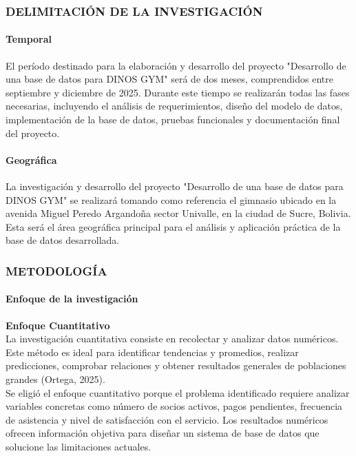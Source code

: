\documentclass[12pt, letterpaper]{article}
\begin{document}
\subsubsection{DELIMITACIÓN DE LA INVESTIGACIÓN}
\paragraph{Temporal}
El período destinado para la elaboración y desarrollo del proyecto "Desarrollo de una base de datos para DINOS GYM" será de dos meses, comprendidos entre septiembre y diciembre de 2025. Durante este tiempo se realizarán todas las fases necesarias, incluyendo el análisis de requerimientos, diseño del modelo de datos, implementación de la base de datos, pruebas funcionales y documentación final del proyecto.

\paragraph{Geográfica}
La investigación y desarrollo del proyecto "Desarrollo de una base de datos para DINOS GYM" se realizará tomando como referencia el gimnasio ubicado en la avenida Miguel Peredo Argandoña sector Univalle, en la ciudad de Sucre, Bolivia. Esta será el área geográfica principal para el análisis y aplicación práctica de la base de datos desarrollada.
\newpage

\subsubsection{METODOLOGÍA}
\paragraph{Enfoque de la investigación}
\textbf{Enfoque Cuantitativo}\\
La investigación cuantitativa consiste en recolectar y analizar datos numéricos. Este método es ideal para identificar tendencias y promedios, realizar predicciones, comprobar relaciones y obtener resultados generales de poblaciones grandes (Ortega, 2025).\\
Se eligió el enfoque cuantitativo porque el problema identificado requiere analizar variables concretas como número de socios activos, pagos pendientes, frecuencia de asistencia y nivel de satisfacción con el servicio. Los resultados numéricos ofrecen información objetiva para diseñar un sistema de base de datos que solucione las limitaciones actuales.
\end{document}
